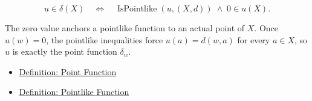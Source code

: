 
\begin{remark*}
\[
u\in\delta(X)
\quad\Longleftrightarrow\quad
\operatorname{IsPointlike}(u,(X,d))
\;\land\;
0\in u(X).
\]
\end{remark*}

\begin{remark*}[Interpretation]
The zero value anchors a pointlike function to an actual point of \(X\).  Once
\(u(w)=0\), the pointlike inequalities force \(u(a)=d(w,a)\) for every
\(a\in X\), so \(u\) is exactly the point function \(\delta_w\).
\end{remark*}

\begin{dependencies}
\begin{itemize}
  \item \hyperref[def:metric-point-function]{Definition: Point Function}
  \item \hyperref[def:metric-pointlike-function]{Definition: Pointlike Function}
\end{itemize}
\end{dependencies}
